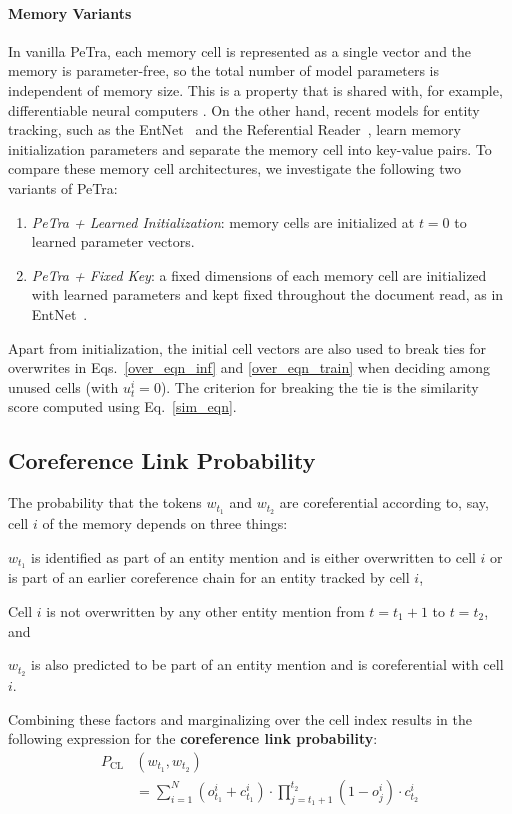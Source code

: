 \documentclass[12pt]{thesis-umich}[thesis]
\begin{document}
\paragraph{Memory Variants}
In vanilla PeTra, each memory cell is represented as a single vector and the memory is parameter-free,
so the total number of model parameters is independent of memory size.  This is a property that is shared with, for example, differentiable neural computers \citep{graves2016hybrid}.
On the other hand, recent models for entity tracking, such as the EntNet~\cite{henaff2016tracking} and the Referential Reader~\cite{liu2019referential}, learn memory initialization parameters and separate the memory cell into key-value pairs.
To compare these memory cell architectures, we investigate the following two variants of PeTra:
\begin{enumerate}
	\item \emph{PeTra + Learned Initialization}: memory cells are initialized at $t=0$ to learned parameter vectors.
	\item \emph{PeTra + Fixed Key}: a fixed dimensions of each memory cell are initialized with  learned parameters and kept fixed throughout the document read, as in EntNet~\cite{henaff2016tracking}.
\end{enumerate}
Apart from initialization, the initial cell vectors are also used to break ties for overwrites in Eqs.~\eqref{over_eqn_inf} and \eqref{over_eqn_train} when deciding among unused cells (with $u^i_t = 0$). The criterion for breaking the tie is the similarity score computed using Eq.~\eqref{sim_eqn}.

\subsection{Coreference Link Probability}
\label{sec:coref_link_prob}
The probability that the tokens $w_{t_1}$ and $w_{t_2}$ are coreferential according to, say, cell $i$ of the memory depends on three things:
\begin{enumerate*}[label=(\alph*)]
	\item $w_{t_1}$ is identified as part of an entity mention and is either overwritten to cell $i$ or is part of an earlier coreference chain for an entity tracked by cell $i$,
	\item Cell $i$ is not overwritten by any other entity mention from $t = {t_1} + 1$ to $t = {t_2}$, and
	\item $w_{t_2}$ is also predicted to be part of an entity mention and  is coreferential with cell $i$.
\end{enumerate*}
Combining these factors and marginalizing over the cell index results in the
following expression for the {\bf coreference link probability}: \begin{align}\label{prob_eqn}
	P_{\mathrm{CL}}&(w_{t_1}, w_{t_2})  \nonumber\\
	&= \sum_{i=1}^{N} (o_{t_1}^{i} + c_{t_1}^{i}) \cdot \! \prod_{j=t_1 + 1}^{t_2} (1 - o_{j} ^ {i}) \cdot c_{t_2}^{i}
\end{align}
\end{document}
